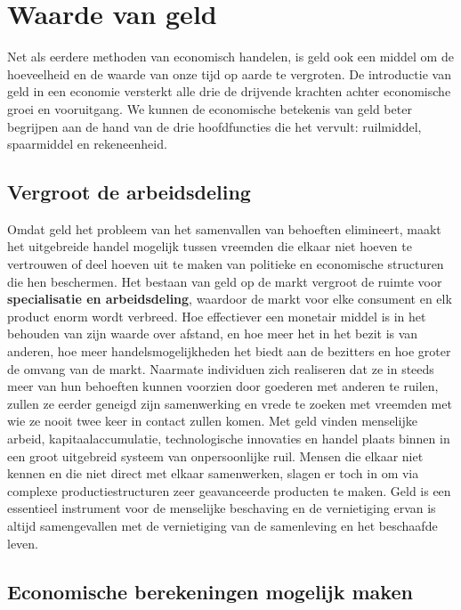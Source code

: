 \documentclass[
  a5paper,
  smalldemyvopaper,11pt,twoside,onecolumn,openright,extrafontsizes,
hidelinks]{memoir}
\begin{document}
\section{Waarde van geld}\label{waarde-van-geld}

Net als eerdere methoden van economisch handelen, is geld ook een middel
om de hoeveelheid en de waarde van onze tijd op aarde te vergroten. De
introductie van geld in een economie versterkt alle drie de drijvende
krachten achter economische groei en vooruitgang. We kunnen de
economische betekenis van geld beter begrijpen aan de hand van de drie
hoofdfuncties die het vervult: ruilmiddel, spaarmiddel en rekeneenheid.

\subsection{Vergroot de arbeidsdeling}\label{vergroot-de-arbeidsdeling}

Omdat geld het probleem van het samenvallen van behoeften elimineert,
maakt het uitgebreide handel mogelijk tussen vreemden die elkaar niet
hoeven te vertrouwen of deel hoeven uit te maken van politieke en
economische structuren die hen beschermen. Het bestaan van geld op de
markt vergroot de ruimte voor \textbf{specialisatie en arbeidsdeling},
waardoor de markt voor elke consument en elk product enorm wordt
verbreed. Hoe effectiever een monetair middel is in het behouden van
zijn waarde over afstand, en hoe meer het in het bezit is van anderen,
hoe meer handelsmogelijkheden het biedt aan de bezitters en hoe groter
de omvang van de markt. Naarmate individuen zich realiseren dat ze in
steeds meer van hun behoeften kunnen voorzien door goederen met anderen
te ruilen, zullen ze eerder geneigd zijn samenwerking en vrede te zoeken
met vreemden met wie ze nooit twee keer in contact zullen komen. Met
geld vinden menselijke arbeid, kapitaalaccumulatie, technologische
innovaties en handel plaats binnen in een groot uitgebreid systeem van
onpersoonlijke ruil. Mensen die elkaar niet kennen en die niet direct
met elkaar samenwerken, slagen er toch in om via complexe
productiestructuren zeer geavanceerde producten te maken. Geld is een
essentieel instrument voor de menselijke beschaving en de vernietiging
ervan is altijd samengevallen met de vernietiging van de samenleving en
het beschaafde leven.

\subsection{Economische berekeningen mogelijk
maken}\label{economische-berekeningen-mogelijk-maken}
\end{document}
